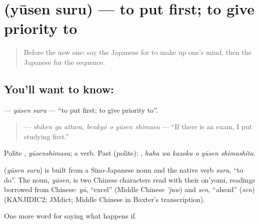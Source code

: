 \section[\texorpdfstring{\ja{ゆうせんする} (yūsen suru)}{ゆうせんする (yūsen suru)}]{ (yūsen suru) — to put first; to give priority to}

\label{lesson:JA-C366-yuusen-suru}



\begin{quote}
Before the new one: say the Japanese for to make up one's mind, then the Japanese for the sequence.
\end{quote}

\subsection*{You'll want to know: }
\textbf{} — \emph{yūsen suru} — \textquotedblleft{}to put first; to give priority to\textquotedblright{}.

\begin{quote}
\textbf{  } — \emph{shiken ga attara, benkyō o yūsen shimasu} — \textquotedblleft{}If there is an exam, I put studying first.\textquotedblright{}
\end{quote}

Polite \textbf{}, \emph{yūsenshimasu}; a  verb. Past (polite): \textbf{  }, \emph{haha wa kazoku o yūsen shimashita}.

\begin{cousinweb}
\textbf{} (\emph{yūsen suru}) is built from a Sino-Japanese noun and the native verb \emph{suru}, \textquotedblleft{}to do\textquotedblright{}. The noun, \emph{yūsen}, is two Chinese characters read with their on'yomi, readings borrowed from Chinese: \emph{yū}, \textquotedblleft{}excel\textquotedblright{} (Middle Chinese \emph{'juw}) and \emph{sen}, \textquotedblleft{}ahead\textquotedblright{} (\emph{sen}) (KANJIDIC2; JMdict; Middle Chinese in Baxter's transcription).
\end{cousinweb}

\begin{grammarlens}[title={What you've built}]
One more word for saying what happens if.
\end{grammarlens}

